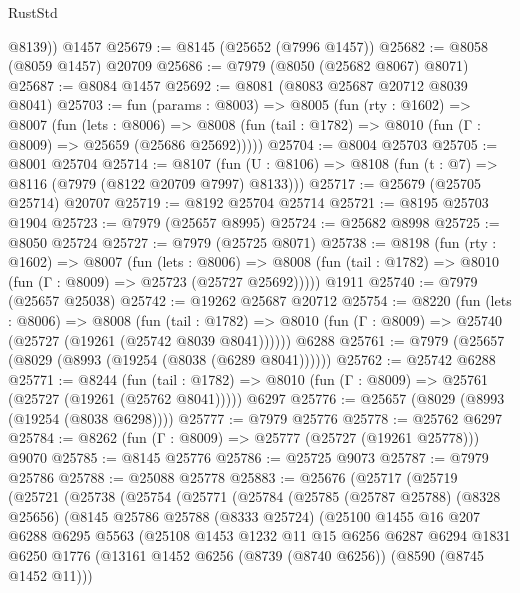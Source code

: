 \begin{lexlean}{RustStd}
\begin{coremodule}
        @8139))
    @1457
@25679 := @8145 (@25652 (@7996 @1457))
@25682 := @8058 (@8059 @1457) @20709
@25686 := @7979 (@8050 (@25682 @8067) @8071)
@25687 := @8084 @1457
@25692 := @8081 (@8083 @25687 @20712 @8039 @8041)
@25703 := fun (params : @8003) =>
  @8005
    (fun (rty : @1602) =>
    @8007
      (fun (lets : @8006) =>
      @8008 (fun (tail : @1782) => @8010 (fun (Γ : @8009) => @25659 (@25686 @25692)))))
@25704 := @8004 @25703
@25705 := @8001 @25704
@25714 := @8107
    (fun (U : @8106) => @8108 (fun (t : @7) => @8116 (@7979 (@8122 @20709 @7997) @8133)))
@25717 := @25679 (@25705 @25714) @20707
@25719 := @8192 @25704 @25714
@25721 := @8195 @25703 @1904
@25723 := @7979 (@25657 @8995)
@25724 := @25682 @8998
@25725 := @8050 @25724
@25727 := @7979 (@25725 @8071)
@25738 := @8198
    (fun (rty : @1602) =>
    @8007
      (fun (lets : @8006) =>
      @8008 (fun (tail : @1782) => @8010 (fun (Γ : @8009) => @25723 (@25727 @25692)))))
    @1911
@25740 := @7979 (@25657 @25038)
@25742 := @19262 @25687 @20712
@25754 := @8220
    (fun (lets : @8006) =>
    @8008
      (fun (tail : @1782) =>
      @8010 (fun (Γ : @8009) => @25740 (@25727 (@19261 (@25742 @8039 @8041))))))
    @6288
@25761 := @7979 (@25657 (@8029 (@8993 (@19254 (@8038 (@6289 @8041))))))
@25762 := @25742 @6288
@25771 := @8244
    (fun (tail : @1782) => @8010 (fun (Γ : @8009) => @25761 (@25727 (@19261 (@25762 @8041)))))
    @6297
@25776 := @25657 (@8029 (@8993 (@19254 (@8038 @6298))))
@25777 := @7979 @25776
@25778 := @25762 @6297
@25784 := @8262 (fun (Γ : @8009) => @25777 (@25727 (@19261 @25778))) @9070
@25785 := @8145 @25776
@25786 := @25725 @9073
@25787 := @7979 @25786
@25788 := @25088 @25778
@25883 := @25676
    (@25717
      (@25719
        (@25721
          (@25738
            (@25754
              (@25771
                (@25784
                  (@25785
                    (@25787 @25788)
                    (@8328 @25656)
                    (@8145
                      @25786
                      @25788
                      (@8333 @25724)
                      (@25100
                        @1455
                        @16
                        @207
                        @6288
                        @6295
                        @5563
                        (@25108
                          @1453
                          @1232
                          @11
                          @15
                          @6256
                          @6287
                          @6294
                          @1831
                          @6250
                          @1776
                          (@13161 @1452 @6256 (@8739 (@8740 @6256)) (@8590 (@8745 @1452 @11)))

\end{coremodule}
\end{lexlean}
